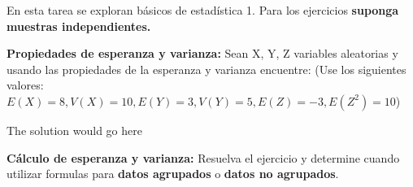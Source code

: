\documentclass{oxmathproblems}
\begin{document}
En esta tarea se exploran básicos de estadística 1. Para los ejercicios \textbf{suponga muestras independientes.}

\begin{questions}

\miquestion \textbf{Propiedades de esperanza y varianza:}
Sean X, Y, Z variables aleatorias y usando las propiedades de la esperanza y varianza encuentre: (Use los siguientes valores: $E(X) = 8, V(X) = 10, E(Y) = 3, V(Y) = 5, E(Z) = -3, E(Z^2) = 10$)  

\begin{solution}
  The solution would go here
\end{solution}


\miquestion \textbf{Cálculo de esperanza y varianza:}
Resuelva el ejercicio y determine cuando utilizar formulas para \textbf{datos agrupados} o \textbf{datos no agrupados}. 

\begin{parts}


\end{parts}
\end{questions}
\end{document}
